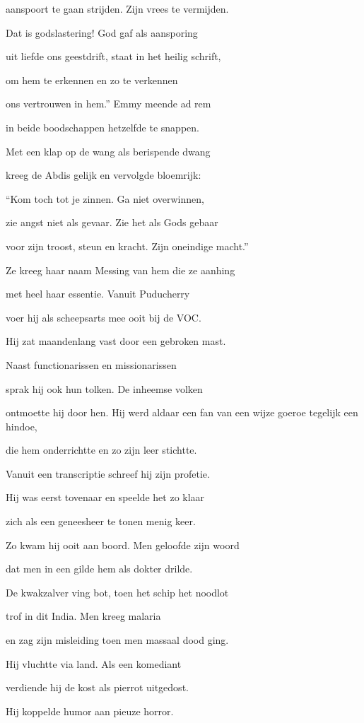 aanspoort te gaan strijden.
Zijn vrees te vermijden.

Dat is godslastering!
God gaf als aansporing

uit liefde ons geestdrift,
staat in het heilig schrift,

om hem te erkennen
en zo te verkennen

ons vertrouwen in hem.”
Emmy meende ad rem

in beide boodschappen
hetzelfde te snappen.

Met een klap op de wang
als berispende dwang

kreeg de Abdis gelijk
en vervolgde bloemrijk:

“Kom toch tot je zinnen.
Ga niet overwinnen,

zie angst niet als gevaar.
Zie het als Gods gebaar

voor zijn troost, steun en kracht.
Zijn oneindige macht.”

Ze kreeg haar naam Messing
van hem die ze aanhing

met heel haar essentie.
Vanuit Puducherry

voer hij als scheepsarts mee
ooit bij de VOC.

Hij zat maandenlang vast
door een gebroken mast.

Naast functionarissen
en missionarissen

sprak hij ook hun tolken.
De inheemse volken

ontmoette hij door hen.
Hij werd aldaar een fan
van een wijze goeroe
tegelijk een hindoe,

die hem onderrichtte
en zo zijn leer stichtte.

Vanuit een transcriptie
schreef hij zijn profetie.

Hij was eerst tovenaar
en speelde het zo klaar

zich als een geneesheer
te tonen menig keer.

Zo kwam hij ooit aan boord.
Men geloofde zijn woord

dat men in een gilde
hem als dokter drilde.

De kwakzalver ving bot,
toen het schip het noodlot

trof in dit India.
Men kreeg malaria

en zag zijn misleiding
toen men massaal dood ging.

Hij vluchtte via land.
Als een komediant

verdiende hij de kost
als pierrot uitgedost.

Hij koppelde humor
aan pieuze horror.

